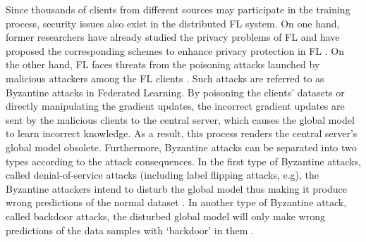 \documentclass[journal]{IEEEtran}
\begin{document}
\par Since thousands of clients from different sources may participate in the training process, security issues also exist in the distributed FL system. On one hand, former researchers have already studied the privacy problems of FL and have proposed the corresponding schemes to enhance privacy protection in FL \cite{ref_33_privacy, ref_34_VerifyNet, wang2019beyond}. On the other hand, FL faces threats from the poisoning attacks launched by malicious attackers among the FL clients \cite{miao2018attack, laishram2016curie}. Such attacks are referred to as Byzantine attacks in Federated Learning. By poisoning the clients' datasets or directly manipulating the gradient updates, the incorrect gradient updates are sent by the malicious clients to the central server, which causes the global model to learn incorrect knowledge. As a result, this process renders the central server's global model obsolete. Furthermore, Byzantine attacks can be separated into two types according to the attack consequences. In the first type of Byzantine attacks, called denial-of-service attacks (including label flipping attacks, e.g), the Byzantine attackers intend to disturb the global model thus making it produce wrong predictions of the normal dataset \cite{ref_04_model,ref_06_model,ref_07_data,yang2017generative,sun2018data}. In another type of Byzantine attack, called backdoor attacks, the disturbed global model will only make wrong predictions of the data samples with `backdoor' in them \cite{ref_08_data,ref_09_backdoor,ref_10_backdoor,ref_11_backdoor,ref_19_backdoor}.
\end{document}
